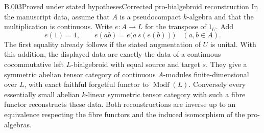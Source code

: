 \begin{saresult}{B.003}{Proved under stated hypotheses}{Corrected pro-bialgebroid reconstruction}
In the manuscript data, assume that $A$ is a pseudocompact $k$-algebra
and that the multiplication is continuous. Write $e:A\longrightarrow L$
for the transpose of $1_U$. Add
\begin{equation}\label{eq:B-character}
 e(1)=1,\qquad
 e(ab)=e\bigl(a\,s(e(b))\bigr)\quad(a,b\in A).
\end{equation}
The first equality already follows if the stated augmentation of $U$
is unital. With this addition, the displayed data are exactly the data
of a continuous cocommutative left $L$-bialgebroid with equal source
and target $s$. They give a symmetric abelian tensor category of
continuous $A$-modules finite-dimensional over $L$, with exact faithful
forgetful functor to $\operatorname{Modf}(L)$. Conversely every
essentially small abelian $k$-linear symmetric tensor category with
such a fibre functor reconstructs these data. Both reconstructions are
inverse up to an equivalence respecting the fibre functors and the
induced isomorphism of the pro-algebras.
\end{saresult}
